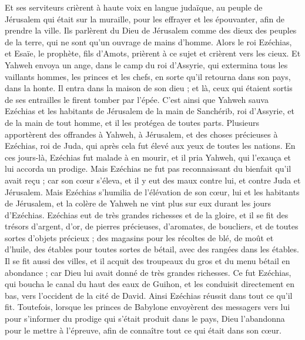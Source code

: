 \begin{multicols}{2}
Et ses serviteurs crièrent à haute voix en langue judaïque, au peuple de Jérusalem qui était sur la muraille, pour les effrayer et les épouvanter, afin de prendre la ville.
Ils parlèrent du Dieu de Jérusalem comme des dieux des peuples de la terre, qui ne sont qu'un ouvrage de mains d'homme.
Alors le roi Ezéchias, et Esaïe, le prophète, fils d'Amots, prièrent à ce sujet et crièrent vers les cieux.
Et Yahweh envoya un ange, dans le camp du roi d'Assyrie, qui extermina tous les vaillants hommes, les princes et les chefs, en sorte qu'il retourna dans son pays, dans la honte. Il entra dans la maison de son dieu ; et là, ceux qui étaient sortis de ses entrailles le firent tomber par l'épée.
C'est ainsi que Yahweh sauva Ezéchias et les habitants de Jérusalem de la main de Sanchérib, roi d'Assyrie, et de la main de tout homme, et il les protégea de toutes parts.
Plusieurs apportèrent des offrandes à Yahweh, à Jérusalem, et des choses précieuses à Ezéchias, roi de Juda, qui après cela fut élevé aux yeux de toutes les nations.
En ces jours-là, Ezéchias fut malade à en mourir, et il pria Yahweh, qui l'exauça et lui accorda un prodige.
Mais Ezéchias ne fut pas reconnaissant du bienfait qu'il avait reçu ; car son cœur s'éleva, et il y eut des maux contre lui, et contre Juda et Jérusalem.
Mais Ezéchias s'humilia de l'élévation de son cœur, lui et les habitants de Jérusalem, et la colère de Yahweh ne vint plus sur eux durant les jours d'Ezéchias.
Ezéchias eut de très grandes richesses et de la gloire, et il se fit des trésors d'argent, d'or, de pierres précieuses, d'aromates, de boucliers, et de toutes sortes d'objets précieux ;
des magasins pour les récoltes de blé, de moût et d'huile, des étables pour toutes sortes de bétail, avec des rangées dans les étables.
Il se fit aussi des villes, et il acquit des troupeaux du gros et du menu bétail en abondance ; car Dieu lui avait donné de très grandes richesses.
Ce fut Ezéchias, qui boucha le canal du haut des eaux de Guihon, et les conduisit directement en bas, vers l'occident de la cité de David. Ainsi Ezéchias réussit dans tout ce qu'il fit.
Toutefois, lorsque les princes de Babylone envoyèrent des messagers vers lui pour s'informer du prodige qui s'était produit dans le pays, Dieu l'abandonna pour le mettre à l'épreuve, afin de connaître tout ce qui était dans son cœur.

\end{multicols}

